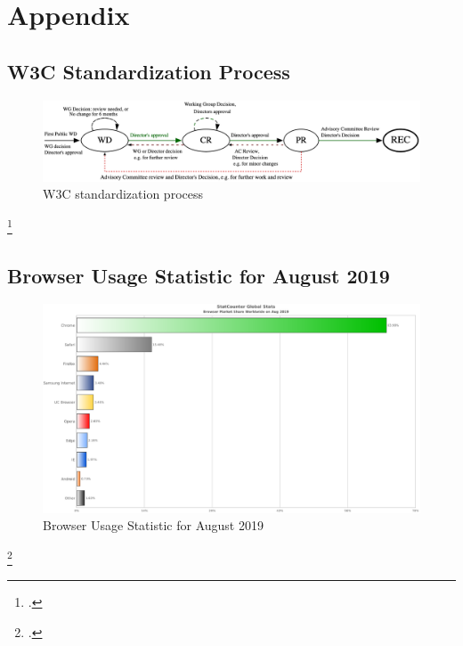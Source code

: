 \appendix

\chapter{Appendix}

\section{W3C Standardization Process}
\label{sec:w3c-process}

\begin{figure}[hbt]
	\centering
	\includegraphics[scale=0.15,angle=90]{pics/svg/w3c_process.eps}
	\caption[W3C standardization process]{W3C standardization process\footnotemark}
	\label{fig:w3c}
\end{figure}
\footcitetext[Source:][Chapter 6.7]{w3c-process}

\newpage

\section{Browser Usage Statistic for August 2019}
\label{sec:stats}

\begin{figure}[hbt]
	\centering
	\includegraphics[scale=0.48,angle=90]{pics/StatCounter-browser-ww-monthly-201908-201908-bar.eps}
	\caption[Browser Usage Statistic for August 2019]{Browser Usage Statistic for August 2019\footnotemark}
	\label{fig:stats}
\end{figure}
\footcitetext[Source][]{statcounter-global}

